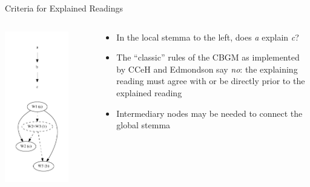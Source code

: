 \documentclass[10pt]{beamer}
\begin{document}
	\begin{frame}{Criteria for Explained Readings}
		\begin{columns}
			\begin{column}{0.4\textwidth}
				\centering
				\includegraphics[width=0.75\textwidth]{../graphics/intermediary-node-example.pdf}
			\end{column}
			\begin{column}{0.55\textwidth}
				\begin{itemize}
					\item In the local stemma to the left, does \emph{a} explain \emph{c}?
					\item The ``classic'' rules of the CBGM as implemented by CCeH and Edmondson say \emph{no}: the explaining reading must agree with or be directly prior to the explained reading
					\item Intermediary nodes may be needed to connect the global stemma
				\end{itemize}
			\end{column}
		\end{columns}
	\end{frame}
\end{document}
